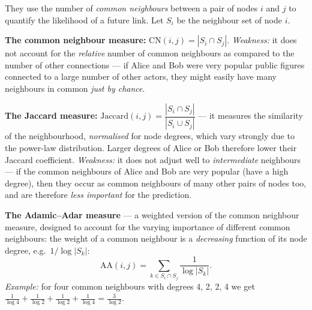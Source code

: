 \documentclass[11pt,a4paper]{article}
\theoremstyle{definition}
\begin{document}
\begin{defbox}
They use the number of \emph{common neighbours} between a pair of nodes $i$ and $j$ to quantify the
likelihood of a future link. Let $S_i$ be the neighbour set of node $i$.

\textbf{The common neighbour measure:} $\mathrm{CN}(i,j)=|S_i\cap S_j|$.
\emph{Weakness:} it does not account for the \emph{relative} number of common neighbours as compared to
the number of other connections --- if Alice and Bob were very popular public figures connected to a
large number of other actors, they might easily have many neighbours in common \emph{just by chance}.

\textbf{The Jaccard measure:} $\mathrm{Jaccard}(i,j)=\dfrac{|S_i\cap S_j|}{|S_i\cup S_j|}$ --- it
measures the similarity of the neighbourhood, \emph{normalised} for node degrees, which vary strongly
due to the power-law distribution. Larger degrees of Alice or Bob therefore lower their Jaccard
coefficient. \emph{Weakness:} it does not adjust well to \emph{intermediate} neighbours --- if the
common neighbours of Alice and Bob are very popular (have a high degree), then they occur as common
neighbours of many other pairs of nodes too, and are therefore \emph{less important} for the
prediction.

\textbf{The Adamic--Adar measure} --- a weighted version of the common neighbour measure, designed to
account for the varying importance of different common neighbours: the weight of a common neighbour is
a \emph{decreasing} function of its node degree, e.g.\ $1/\log|S_k|$:
\[ \mathrm{AA}(i,j)=\sum_{k\in S_i\cap S_j}\frac{1}{\log|S_k|}. \]
\emph{Example:} for four common neighbours with degrees 4, 2, 2, 4 we get
$\frac{1}{\log 4}+\frac{1}{\log 2}+\frac{1}{\log 2}+\frac{1}{\log 4}=\frac{3}{\log 2}$.
\end{defbox}
\end{document}
